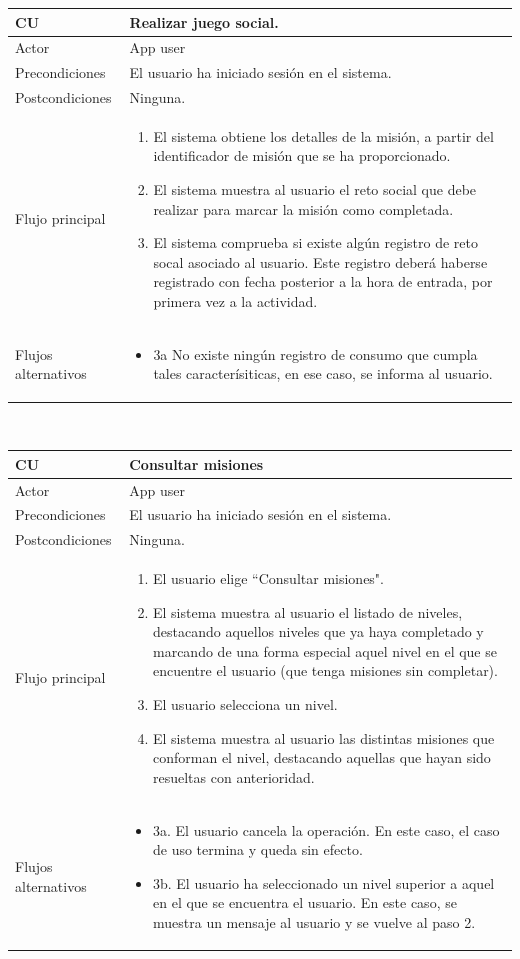 \documentclass[twoside]{report}
\newcommand\addrow[2]{#1 &#2\\ }
\newcommand\addheading[2]{#1 &#2\\ \hline}
\newcommand\tabularhead{\begin{tabular}{lp{0.7\textwidth}}
\hline
}
\newenvironment{usecase}{\tabularhead}
{\hline\end{tabular}}
\begin{document}
\begin{usecase}
  \addheading{\textbf{CU\arabic{usecase}}}{Realizar juego social.} 
  \addrow{Actor}{App user}
  \addrow{Precondiciones}{El usuario ha iniciado sesión en el sistema.}
  \addrow{Postcondiciones}{Ninguna.}
  \addrow{Flujo principal}{
  		\begin{enumerate}
  		\item El sistema obtiene los detalles de la misión, a partir del identificador de misión que se ha proporcionado.
  		\item El sistema muestra al usuario el reto social que debe realizar para marcar la misión como completada.
  		\item El sistema comprueba si existe algún registro de reto socal asociado al usuario. Este registro deberá haberse registrado con fecha posterior a la hora de entrada, por primera vez a la actividad.
  		\end{enumerate}
  }
  \addrow{Flujos alternativos}{
  		\begin{itemize}
  		\item 3a No existe ningún registro de consumo que cumpla tales caracterísiticas, en ese caso, se informa al usuario.
  		\end{itemize}
  }
\end{usecase}\\

\begin{usecase}
  \addheading{\textbf{CU\arabic{usecase}}}{Consultar misiones} 
  \addrow{Actor}{App user}
  \addrow{Precondiciones}{El usuario ha iniciado sesión en el sistema.}
  \addrow{Postcondiciones}{Ninguna.}
  \addrow{Flujo principal}{
  		\begin{enumerate}
  		\item El usuario elige “Consultar misiones". %
  		\item El sistema muestra al usuario el listado de niveles, destacando aquellos niveles que ya haya completado y marcando de una forma especial aquel nivel en el que se encuentre el usuario (que tenga misiones sin completar). %
  		\item El usuario selecciona un nivel. %
  		\item El sistema muestra al usuario las distintas misiones que conforman el nivel, destacando aquellas que hayan sido resueltas con anterioridad. %
  		\end{enumerate}
  }
  \addrow{Flujos alternativos}{
  		\begin{itemize}
  		\item 3a. El usuario cancela la operación. En este caso, el caso de uso termina y queda sin efecto.
  		\item 3b. El usuario ha seleccionado un nivel superior a aquel en el que se encuentra el usuario. En este caso, se muestra un mensaje al usuario y se vuelve al paso 2.
  		\end{itemize}
  }
\end{usecase}\\
\end{document}
